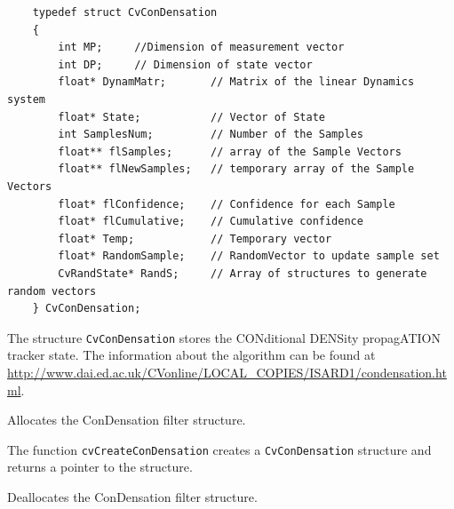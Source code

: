 \begin{lstlisting}
    typedef struct CvConDensation
    {
        int MP;     //Dimension of measurement vector
        int DP;     // Dimension of state vector
        float* DynamMatr;       // Matrix of the linear Dynamics system
        float* State;           // Vector of State
        int SamplesNum;         // Number of the Samples
        float** flSamples;      // array of the Sample Vectors
        float** flNewSamples;   // temporary array of the Sample Vectors
        float* flConfidence;    // Confidence for each Sample
        float* flCumulative;    // Cumulative confidence
        float* Temp;            // Temporary vector
        float* RandomSample;    // RandomVector to update sample set
        CvRandState* RandS;     // Array of structures to generate random vectors
    } CvConDensation;

\end{lstlisting}
The structure \texttt{CvConDensation} stores the CONditional DENSity propagATION tracker state. The information about the algorithm can be found at \url{http://www.dai.ed.ac.uk/CVonline/LOCAL\_COPIES/ISARD1/condensation.html}.

\label{CreateConDensation}

Allocates the ConDensation filter structure.


\begin{description}
\end{description}

The function \texttt{cvCreateConDensation} creates a \texttt{CvConDensation} structure and returns a pointer to the structure.

\label{ReleaseConDensation}

Deallocates the ConDensation filter structure.

\begin{description}
\end{description}

